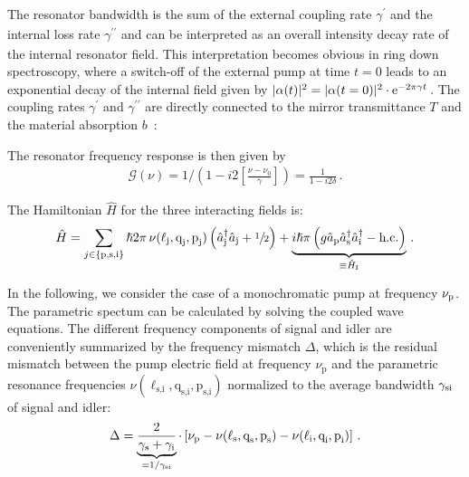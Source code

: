 \documentclass[aps,pra,showpacs,reprint,onecolumn,notitlepage]{revtex4-1}
\makeatletter
\newcommand{\tx}[1]{\textnormal{#1}}
\def\@fnsymbol#1{\ensuremath{\ifcase#1\or *\or \dagger\or \ddagger\or
   \mathsection\or \mathparagraph\or \|\or **\or \dagger\dagger
   \or \ddagger\ddagger \else\@ctrerr\fi}}
\newcommand{\ssym}[1]{^{\@fnsymbol{#1}}}
\makeatother
\begin{document}
The resonator bandwidth is the sum of the external coupling rate $\gamma^{\prime}_\textrm{}$ and the internal loss rate $\gamma^{\prime\prime}_\textrm{}$ and can be interpreted as an overall intensity decay rate of the internal resonator field. This interpretation becomes obvious in ring down spectroscopy, where a switch-off of the external pump at time $t=0$ leads to an exponential decay of the internal field given by $|\alpha(t)|^2 = |\alpha(t=0)|^2 \cdot \tx{e}^{- 2 \pi \gamma t}\,$. The coupling rates $\gamma^\prime$ and $\gamma^{\prime\prime}$ are directly connected to the mirror transmittance $T$ and the material absorption $b\,$ \cite{Bachor2004}:

The resonator frequency response is then given by
\begin{align}
	\mathcal{G} (\nu) = 1 / \left( 1 - i 2 {\left[ \frac{\nu-\nu_0}{\gamma} \right]}  \right) = \frac{1}{ {1 - i 2 \delta} } \,.
	\label{eq:cavityresponse}
\end{align}

The Hamiltonian $\hat{H}$ for the three interacting fields is:
\begin{align}
	\hat{H} = {\sum_{j \in \left\lbrace \tx{p,s,i} \right\rbrace}{\hslash 2 \pi \, \nu (\ell_\textrm{j},\textrm{q}_\textrm{j},\textrm{p}_\textrm{j}) \left( \hat{a}\ssym{2}_\tx{j} \hat{a}_\tx{j} + \sfrac{1}{2} \right)} }
	+ \underbrace{i \hslash \pi  \left( {g} \hat{a}_\tx{p}  \hat{a}_\tx{s}\ssym{2} \hat{a}_\tx{i}\ssym{2} - \tx{h.c.} \right) }_{ \equiv \hat{H}_\tx{I}} \,.
	\label{eq:HamiltonianPDC}
\end{align}

In the following, we consider the case of a monochromatic pump at frequency $\nu_\tx{p}$.  The parametric spectum can be calculated by solving the coupled wave equations. The different frequency components of signal and idler are conveniently summarized by the frequency mismatch $\Delta$, which is the residual mismatch between the pump electric field at frequency $\nu_\textrm{p}$ and the parametric resonance frequencies $\nu (\ell_\textrm{s,i},\textrm{q}_\textrm{s,i},\textrm{p}_\textrm{s,i})$ normalized to the average bandwidth $\gamma_\tx{si}$ of signal and idler:
\begin{align}
 	\Delta = \underbrace{\frac{2}{\gamma_\textrm{s}+\gamma_\textrm{i}} }_{ = 1 / \gamma_\tx{si}} \cdot \left[ \nu_\textrm{p} - \nu (\ell_\textrm{s},\textrm{q}_\textrm{s},	\textrm{p}_\textrm{s} ) - \nu (\ell_\textrm{i},\textrm{q}_\textrm{i},\textrm{p}_\textrm{i} ) \right] \,.
 	\label{eq:SPDCfrequ}
\end{align} 
\end{document}
